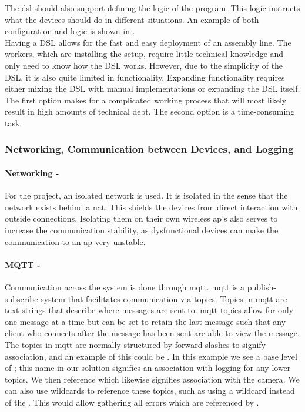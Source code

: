 The \acrshort{dsl} should also support defining the logic of the program. This logic instructs what the devices should do in different situations. An example of both configuration and logic is shown in .\\

Having a DSL allows for the fast and easy deployment of an assembly line. The workers, which are installing the setup, require little technical knowledge and only need to know how the DSL works. However, due to the simplicity of the DSL, it is also quite limited in functionality. Expanding functionality requires either mixing the DSL with manual implementations or expanding the DSL itself. The first option makes for a complicated working process that will most likely result in high amounts of technical debt. The second option is a time-consuming task. 

\newpage
\subsubsection{Networking, Communication between Devices, and Logging}\hfill
\paragraph{Networking -}
For the project, an isolated network is used. It is isolated in the sense that the network exists behind a \acrshort{nat}. This shields the devices from direct interaction with outside connections. Isolating them on their own wireless \acrshort{ap}'s also serves to increase the communication stability, as dysfunctional devices can make the communication to an \acrshort{ap} very unstable.
\paragraph{MQTT -}
Communication across the system is done through \acrshort{mqtt}. \acrshort{mqtt} is a publish-subscribe system that facilitates communication via topics. Topics in \acrshort{mqtt} are text strings that describe where messages are sent to. \acrshort{mqtt} topics allow for only one message at a time but can be set to retain the last message such that any client who connects after the message has been sent are able to view the message. The topics in \acrshort{mqtt} are normally structured by forward-slashes to signify association, and an example of this could be . In this example we see a base level of ; this name in our solution signifies an association with logging for any lower topics. We then reference  which likewise signifies association with the camera. We can also use wildcards to reference these topics, such as using a wildcard instead of the . This would allow gathering all errors which are referenced by .
